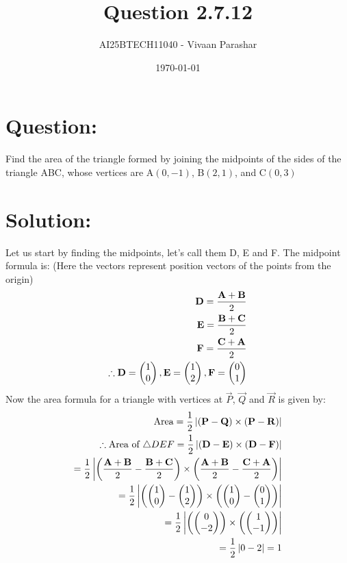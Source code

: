 \documentclass[a4paper, 12pt]{article}
\title{Question 2.7.12}
\author{AI25BTECH11040 - Vivaan Parashar}
\date{\today}
\begin{document}
\maketitle

\section{Question: }
Find the area of the triangle formed by joining the midpoints of the sides of the triangle ABC, whose vertices are A$(0, -1)$, B$(2, 1)$, and C$(0, 3)$

\section{Solution: }
Let us start by finding the midpoints, let's call them D, E and F.
The midpoint formula is: (Here the vectors represent position vectors of the points from the origin)
\begin{align}
    \mathbf{D} = \frac{\mathbf{A}+\mathbf{B}}{2} \\
    \mathbf{E} = \frac{\mathbf{B}+\mathbf{C}}{2} \\
    \mathbf{F} = \frac{\mathbf{C}+\mathbf{A}}{2} \\
    \therefore \mathbf{D} = \begin{pmatrix}1       \\ 0\end{pmatrix}, \mathbf{E} = \begin{pmatrix}1 \\ 2\end{pmatrix}, \mathbf{F} = \begin{pmatrix}0 \\ 1\end{pmatrix}
\end{align}
Now the area formula for a triangle with vertices at $\vec{P}$, $\vec{Q}$ and $\vec{R}$ is given by:
\begin{align}
    \text{Area} = \frac{1}{2} \left| (\mathbf{P} - \mathbf{Q}) \times (\mathbf{P} - \mathbf{R}) \right|                              \\
    \therefore \text{Area of } \triangle DEF = \frac{1}{2} \left| (\mathbf{D} - \mathbf{E}) \times (\mathbf{D} - \mathbf{F}) \right| \\
    = \frac{1}{2} \left| \left( \frac{\mathbf{A}+\mathbf{B}}{2} - \frac{\mathbf{B}+\mathbf{C}}{2} \right) \times \left( \frac{\mathbf{A} + \mathbf{B}}{2} - \frac{\mathbf{C}+\mathbf{A}}{2}\right) \right| \\
    = \frac{1}{2} \left| \left( \begin{pmatrix}1                                                                                 \\ 0\end{pmatrix} - \begin{pmatrix}1 \\ 2\end{pmatrix} \right) \times \left( \begin{pmatrix}1 \\ 0\end{pmatrix} - \begin{pmatrix}0 \\ 1\end{pmatrix} \right) \right|\\
    = \frac{1}{2} \left| \left( \begin{pmatrix}0                                                                                 \\ -2\end{pmatrix} \right) \times \left( \begin{pmatrix}1 \\ -1\end{pmatrix} \right) \right|\\
    = \frac{1}{2} \left| 0 - 2 \right| = 1
\end{align}
\end{document}
